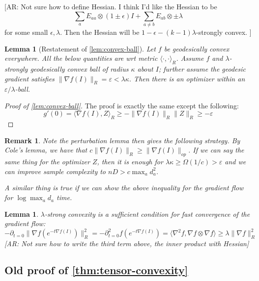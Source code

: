 \documentclass{article}
\newtheorem{lemma}[theorem]{Lemma}
\newtheorem{remark}{Remark}
\newcommand\eps{\varepsilon}
\newcommand{\AR}[1]{{\color{orange}[AR: #1]}}
\begin{document}
\AR{Not sure how to define Hessian. I think I'd like the Hessian to be
\[  \sum_{a} E_{aa} \otimes (1 \pm \epsilon) I + \sum_{a \neq b} E_{ab} \otimes \pm \lambda  \]
for some small $\epsilon,\lambda$. Then the Hessian will be $1-\epsilon - (k-1) \lambda$-strongly convex. }



\begin{lemma} [Restatement of \cref{lem:convex-ball}]
Let $f$ be geodesically convex everywhere. All the below quantities are wrt metric $\langle \cdot, \cdot \rangle_{R}$. Assume $f$ and $\lambda$-strongly geodesically convex ball of radius $\kappa$ about $I$; further assume the geodesic gradient satisfies $\|\nabla f(I)\|_{R} = \eps < \lambda \kappa$. Then there is an optimizer within an $\eps/\lambda$-ball.
\end{lemma}
\begin{proof} [Proof of \cref{lem:convex-ball}]
The proof is exactly the same except the following:
\[ g'(0) = \langle \nabla f(I), Z \rangle_{R} \geq - \|\nabla f(I)\|_{R} \|Z\|_{R} \geq - \eps     \]
\end{proof}

\begin{remark}
Note the perturbation lemma then gives the following strategy. By Cole's lemma, we have that $c \|\nabla f(I)\|_{R} \geq \|\nabla f(I)\|_{op}$. If we can say the same thing for the optimizer $Z$, then it is enough for $\lambda \kappa \geq \Omega(1/c) > \eps$ and we can improve sample complexity to $nD > c \max_{a} d_{a}^{2}$.

A similar thing is true if we can show the above inequality for the gradient flow for $\log \max_{a} d_{a}$ time.
\end{remark}

\begin{lemma}
$\lambda$-strong convexity is a sufficient condition for fast convergence of the gradient flow:
\[ - \partial_{t=0} \|\nabla f(e^{-t\nabla f(I)})\|_{R}^{2} = -\partial_{t=0}^{2} f(e^{-t\nabla f(I)}) = \langle \nabla^{2} f, \nabla f \otimes \nabla f \rangle \geq \lambda \|\nabla f\|_{R}^{2}    \]
\AR{Not sure how to write the third term above, the inner product with Hessian}
\end{lemma}

\subsection{Old proof of \cref{thm:tensor-convexity}}
\end{document}
